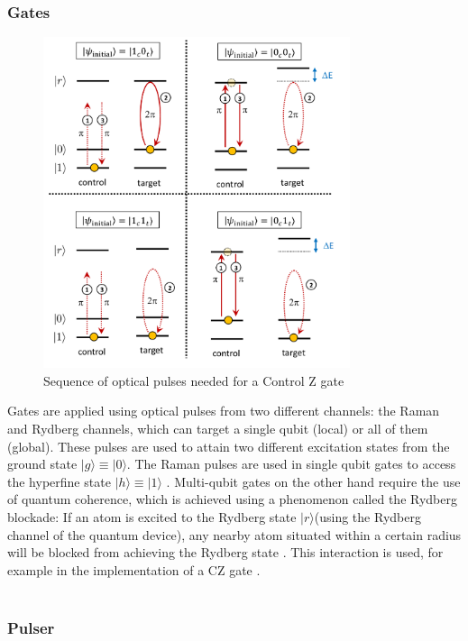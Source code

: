 \subsubsection{Gates}
\begin{figure}
  \centering
  \includegraphics[width=90mm]{./Images/CZbeams.png}
  \caption{Sequence of optical pulses needed for a Control Z gate \cite{silverioPulserOpensourcePackage2022}} 
  \label{fig:CZ}

\end{figure}
Gates are applied using optical pulses from two different channels: the Raman and Rydberg channels, which can target a single qubit (local) or all of them (global). 
These pulses are used to attain two different excitation states from the ground state $|g \rangle \equiv|0 \rangle$. The Raman pulses are used in single qubit gates to access the hyperfine state $|h \rangle \equiv |1 \rangle$ \cite{tsaiPulselevelSchedulingQuantum2022}.
Multi-qubit gates on the other hand require the use of quantum coherence, which is achieved using a phenomenon called the Rydberg blockade: If an atom is excited to the Rydberg state $|r \rangle$\cite{cohenQuantumComputingCircular2021}(using the Rydberg channel of the quantum device), any nearby atom situated
within a certain radius will be blocked from achieving the Rydberg state \cite{saffmanQuantumComputingAtomic2016}. This interaction is used, for example in the implementation of a CZ gate \cite{saffmanQuantumInformationRydberg2010}. 
\\ \\

\subsubsection{Pulser}


